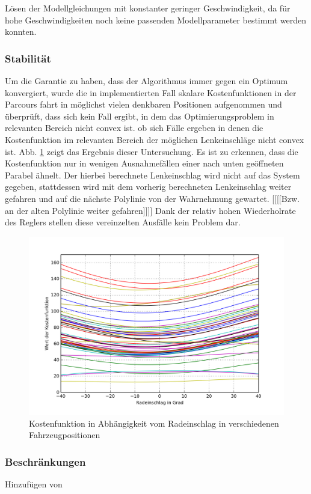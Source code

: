 Lösen der Modellgleichungen mit konstanter geringer Geschwindigkeit, da für hohe Geschwindigkeiten noch keine passenden Modellparameter bestimmt werden konnten.
\subsubsection{Stabilität}
Um die Garantie zu haben, dass der Algorithmus immer gegen ein Optimum konvergiert, wurde die in implementierten Fall skalare Kostenfunktionen in der Parcours fahrt in möglichst vielen denkbaren Positionen aufgenommen und überprüft, dass sich kein Fall ergibt, in dem das Optimierungsproblem in relevanten Bereich nicht convex ist. ob sich Fälle ergeben in denen die Kostenfunktion im relevanten Bereich der möglichen Lenkeinschläge nicht convex ist. Abb. \ref{fig:parabel} zeigt das Ergebnis dieser Untersuchung. Es ist zu erkennen, dass die Kostenfunktion nur in wenigen Ausnahmefällen einer nach unten geöffneten Parabel ähnelt. Der hierbei berechnete Lenkeinschlag wird nicht auf das System gegeben, stattdessen wird mit dem vorherig berechneten Lenkeinschlag weiter gefahren und auf die nächste Polylinie von der Wahrnehmung gewartet. [[[[Bzw. an der alten Polylinie weiter gefahren]]]] Dank der relativ hohen Wiederholrate des Reglers stellen diese vereinzelten Ausfälle kein Problem dar.
\begin{figure}[t]
\centering
\includegraphics[scale=0.75]{Bilder/Parabeln.png}
\caption{Kostenfunktion in Abhängigkeit vom Radeinschlag in verschiedenen Fahrzeugpositionen}
\label{fig:parabel}
\end{figure}

\subsubsection{Beschränkungen}
Hinzufügen von ~
